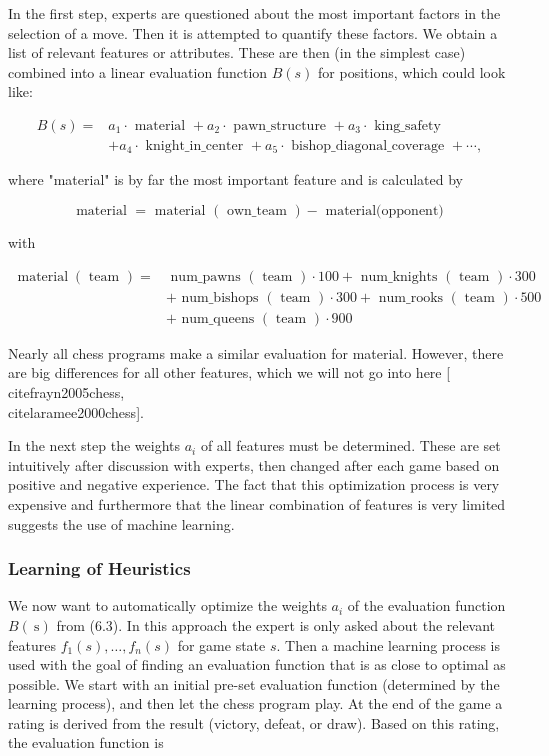 \documentclass[10pt]{book}
\begin{document}
In the first step, experts are questioned about the most important factors in the selection of a move. Then it is attempted to quantify these factors. We obtain a list of relevant features or attributes. These are then (in the simplest case) combined into a linear evaluation function $B(s)$ for positions, which could look like:


\begin{align*}
B(s)= & a_{1} \cdot \text { material }+a_{2} \cdot \text { pawn_structure }+a_{3} \cdot \text { king_safety } \\
& +a_{4} \cdot \text { knight_in_center }+a_{5} \cdot \text { bishop_diagonal_coverage }+\cdots, \tag{6.3}
\end{align*}


where "material" is by far the most important feature and is calculated by

$$
\text { material }=\text { material }(\text { own_team })-\text { material(opponent) }
$$

with

$$
\begin{aligned}
\operatorname{material}(\text { team })= & \text { num_pawns }(\text { team }) \cdot 100+\text { num_knights }(\text { team }) \cdot 300 \\
& + \text { num_bishops }(\text { team }) \cdot 300+\text { num_rooks }(\text { team }) \cdot 500 \\
& + \text { num_queens }(\text { team }) \cdot 900
\end{aligned}
$$

Nearly all chess programs make a similar evaluation for material. However, there are big differences for all other features, which we will not go into here [\\cite{frayn2005chess}, \\cite{laramee2000chess}].

In the next step the weights $a_{i}$ of all features must be determined. These are set intuitively after discussion with experts, then changed after each game based on positive and negative experience. The fact that this optimization process is very expensive and furthermore that the linear combination of features is very limited suggests the use of machine learning.

\subsubsection*{Learning of Heuristics}
We now want to automatically optimize the weights $a_{i}$ of the evaluation function $B(\mathrm{~s})$ from (6.3). In this approach the expert is only asked about the relevant features $f_{1}(s), \ldots, f_{n}(s)$ for game state $s$. Then a machine learning process is used with the goal of finding an evaluation function that is as close to optimal as possible. We start with an initial pre-set evaluation function (determined by the learning process), and then let the chess program play. At the end of the game a rating is derived from the result (victory, defeat, or draw). Based on this rating, the evaluation function is
\end{document}
